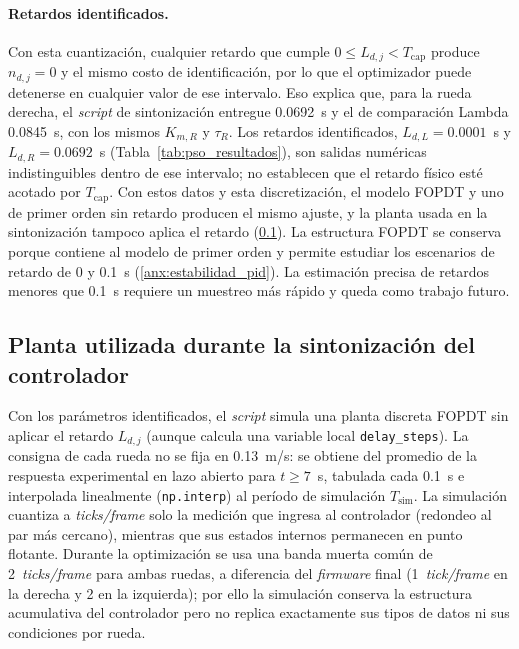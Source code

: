 \begin{appendices}
\paragraph{Retardos identificados.} Con esta cuantización, cualquier retardo que cumple
$0\leq L_{d,j}<T_{\mathrm{cap}}$ produce $n_{d,j}=0$ y el mismo costo de identificación,
por lo que el optimizador puede detenerse en cualquier valor de ese intervalo.
Eso explica que, para la rueda derecha, el \textit{script} de sintonización
entregue 0.0692~s y el de comparación Lambda 0.0845~s, con los mismos
$K_{m,R}$ y $\tau_R$. Los retardos identificados, $L_{d,L}=0.0001$~s y
$L_{d,R}=0.0692$~s (Tabla~\ref{tab:pso_resultados}), son salidas numéricas
indistinguibles dentro de ese intervalo; no establecen que el retardo físico
esté acotado por $T_{\mathrm{cap}}$. Con estos datos y esta discretización,
el modelo FOPDT y uno de primer orden sin retardo producen el mismo ajuste,
y la planta usada en la sintonización tampoco aplica el retardo
(\ref{anx:planta_sintonizacion}). La estructura FOPDT se conserva porque
contiene al modelo de primer orden y permite estudiar los escenarios de
retardo de 0 y 0.1~s (\ref{anx:estabilidad_pid}). La
estimación precisa de retardos menores que 0.1~s requiere un muestreo más
rápido y queda como trabajo futuro.

\subsection{Planta utilizada durante la sintonización del controlador}
\label{anx:planta_sintonizacion}

Con los parámetros identificados, el \textit{script} simula una planta discreta FOPDT sin aplicar el retardo $L_{d,j}$ (aunque calcula una variable local \texttt{delay\_steps}). La consigna de cada rueda no se fija en 0.13~m/s: se obtiene del promedio de la respuesta experimental en lazo abierto para $t\geq7$~s, tabulada cada 0.1~s e interpolada linealmente (\texttt{np.interp}) al período de simulación $T_{\mathrm{sim}}$. La simulación cuantiza a \textit{ticks/frame} solo la medición que ingresa al controlador (redondeo al par más cercano), mientras que sus estados internos permanecen en punto flotante. Durante la optimización se usa una banda muerta común de 2~\textit{ticks/frame} para ambas ruedas, a diferencia del \textit{firmware} final (1~\textit{tick/frame} en la derecha y 2 en la izquierda); por ello la simulación conserva la estructura acumulativa del controlador pero no replica exactamente sus tipos de datos ni sus condiciones por rueda.


\end{appendices}
